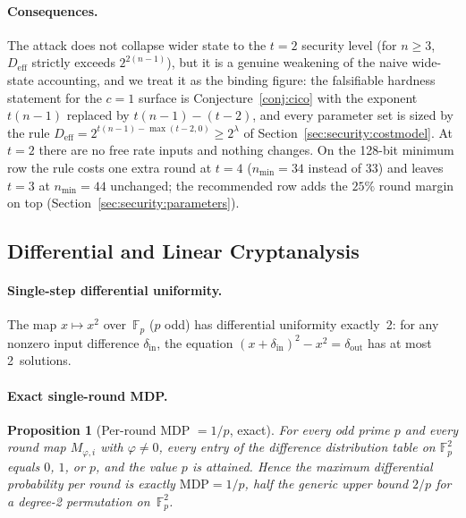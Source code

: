 \documentclass[11pt,a4paper]{article}
\newtheorem{proposition}[theorem]{Proposition}
\theoremstyle{definition}
\newcommand{\Fp}{\mathbb{F}_p}
\begin{document}
\paragraph{Consequences.}
The attack does not collapse wider state to the $t=2$ security level
(for $n \ge 3$, $D_{\mathrm{eff}}$ strictly exceeds $2^{2(n-1)}$),
but it is a genuine weakening of the naive wide-state accounting,
and we treat it as the binding figure: the falsifiable hardness
statement for the $c = 1$ surface is Conjecture~\ref{conj:cico} with
the exponent $t(n-1)$ replaced by $t(n-1) - (t-2)$, and every
parameter set is sized by the rule
$D_{\mathrm{eff}} = 2^{t(n-1)-\max(t-2,0)} \ge 2^{\lambda}$ of
Section~\ref{sec:security:costmodel}. At $t = 2$ there are no free
rate inputs and nothing changes. On the 128-bit minimum row the rule
costs one extra round at $t = 4$ ($n_{\min} = 34$ instead of $33$)
and leaves $t = 3$ at $n_{\min} = 44$ unchanged; the recommended row
adds the $25\%$ round margin on top
(Section~\ref{sec:security:parameters}).


\subsection{Differential and Linear Cryptanalysis}\label{sec:security:difflin}

\paragraph{Single-step differential uniformity.}
The map $x \mapsto x^2$ over~$\Fp$ ($p$ odd) has differential uniformity
exactly~2: for any nonzero input difference $\delta_{\mathrm{in}}$, the
equation $(x + \delta_{\mathrm{in}})^2 - x^2 = \delta_{\mathrm{out}}$ has
at most 2~solutions.

\paragraph{Exact single-round MDP.}

\begin{proposition}[Per-round MDP $= 1/p$, exact]\label{prop:mdp}
For every odd prime $p$ and every round map $M_{\varphi,i}$ with
$\varphi \ne 0$, every entry of the difference distribution table on
$\Fp^2$ equals $0$, $1$, or $p$, and the value $p$ is attained.
Hence the maximum differential probability per round is exactly
$\mathrm{MDP} = 1/p$, half the generic upper bound $2/p$ for a
degree-2 permutation on~$\Fp^2$.
\end{proposition}
\end{document}
